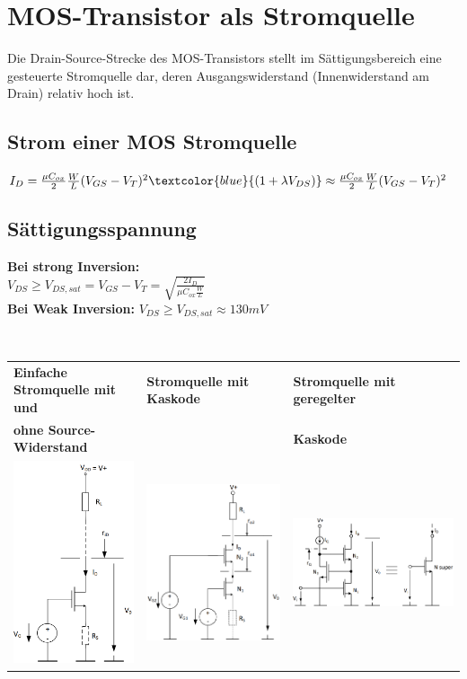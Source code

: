 \section{MOS-Transistor als Stromquelle}
Die Drain-Source-Strecke des MOS-Transistors stellt im Sättigungsbereich eine gesteuerte Stromquelle dar, deren Ausgangswiderstand (Innenwiderstand am Drain) relativ hoch ist.\\
\begin{minipage}{0.5\linewidth}
\subsection{Strom einer MOS Stromquelle}
$I_D = \frac{\mu C_{ox}}{2}\frac{W}{L}(V_{GS}-V_T)^2\textcolor{blue}{(1+\lambda V_{DS})}\approx\frac{\mu C_{ox}}{2}\frac{W}{L}(V_{GS}-V_T)^2$
\end{minipage}%
\begin{minipage}{0.5\linewidth}
\subsection{Sättigungsspannung}
\textbf{Bei strong Inversion:}\\ $V_{DS} \geq V_{DS,sat} = V_{GS} - V_T = \sqrt{\frac{2 I_D}{\mu C_{ox}\frac{W}{L}}}$\vspace{5pt}\\
\textbf{Bei Weak Inversion:} $V_{DS} \geq V_{DS,sat}\approx 130 mV$
\end{minipage}\vspace{5pt}\\
\begin{tabular}{|l|l|l|}
    \hline
    \textbf{Einfache Stromquelle mit und} & \textbf{Stromquelle mit Kaskode} & \textbf{Stromquelle mit geregelter} \\
    \textbf{ohne Source-Widerstand}         &                                  & \textbf{Kaskode} \\
    \includegraphics[width=0.15\linewidth]{Einfachste Stromquelle.png} & \includegraphics[width=0.2\linewidth]{Stromquelle mit Kaskode.png} & \includegraphics[width=0.3\linewidth]{Super Transistor.png} \\
    \hline
\end{tabular} \vspace{5pt}\\
